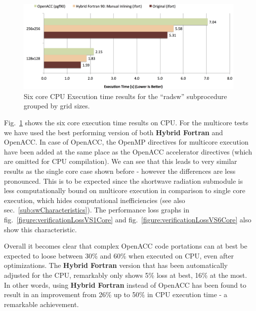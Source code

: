 \begin{figure}[htpb]
        \centering
        \includegraphics[width=14cm]{figures/verificationCPU6CoreExecTime}
        \caption[Six Core CPU Execution Time Results of Sample Implementation]{Six core CPU Execution time results for the ``radsw'' subprocedure grouped by grid sizes.}
        \label{figure:verificationCPU6CoreExecTime}
\end{figure}

Fig.~\ref{figure:verificationCPU6CoreExecTime} shows the six core execution time results on CPU. For the multicore tests we have used the best performing version of both \textbf{Hybrid Fortran} and OpenACC. In case of OpenACC, the OpenMP directives for multicore execution have been added at the same place as the OpenACC accelerator directives (which are omitted for CPU compilation). We can see that this leads to very similar results as the single core case shown before - however the differences are less pronounced. This is to be expected since the shortwave radiation submodule is less computationally bound on multicore execution in comparison to single core execution, which hides computational inefficiencies (see also sec.~\ref{sub:swCharacteristics}). The performance loss graphs in fig.~\ref{figure:verificationLossVS1Core} and fig.~\ref{figure:verificationLossVS6Core} also show this characteristic.

Overall it becomes clear that complex OpenACC code portations can at best be expected to loose between 30\% and 60\% when executed on CPU, even after optimizations. The \textbf{Hybrid Fortran} version that has been automatically adjusted for the CPU, remarkably only shows 5\% loss at best, 16\% at the most. In other words, using \textbf{Hybrid Fortran} instead of OpenACC has been found to result in an improvement from 26\% up to 50\% in CPU execution time - a remarkable achievement.

